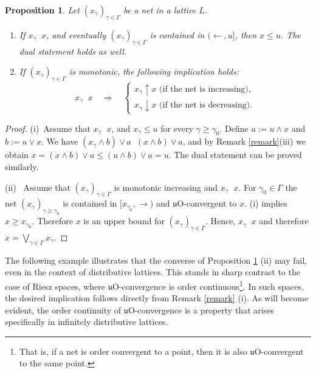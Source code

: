 \documentclass[12pt,a4paper]{amsart}
\numberwithin{equation}{section}
\newtheorem{prop}[thm]{Proposition}
\theoremstyle{definition}
\newcommand{\converges}[1]{\mathop{\overset{\text{#1}}{\longrightarrow}}}
\begin{document}
\begin{prop}\label{38}
	Let $(x_\gamma)_{\gamma\in\Gamma}$ be a net in a  lattice $L$.  
	\begin{enumerate}[{\rm(i)}]
	\item If $x_{\gamma} \converges{$\mathfrak{u}$O} x$,  and eventually $(x_\gamma)_{\gamma\in\Gamma}$ is contained in $(\leftarrow, u]$, then $x\le u$.  The dual statement holds as well.
	\item If $(x_{\gamma})_{\gamma \in \Gamma}$ is monotonic, the following implication holds:	
	\[x_{\gamma} \converges{$\mathfrak{u}$O} x\quad\Longrightarrow\quad \begin{cases}
x_{\gamma}\uparrow x\text{ (if the net is increasing)},\\
x_{\gamma}\downarrow x\text{ (if the net is decreasing)}.
\end{cases}\]
	\end{enumerate}
\end{prop}
\begin{proof}
{\rm(i)}~Assume that $x_{\gamma} \converges{$\mathfrak{u}$O} x$, and $x_\gamma\le u$ for every $\gamma\ge \gamma_0$.  Define $a:=u\wedge x$ and $b:=u\vee x$.  We have $(x_\gamma\wedge b)\vee a\converges{O}(x\wedge b)\vee a$,  and by  Remark \ref{remark}{\rm(iii)} we obtain $x=(x\wedge b)\vee a\le(u\wedge b)\vee a=u$.  The dual statement can be proved similarly.  

{\rm(ii)}~ Assume that $(x_\gamma)_{\gamma\in\Gamma}$ is monotonic increasing and $x_{\gamma} \converges{$\mathfrak{u}$O} x$.  For $\gamma_{0} \in \Gamma$ the net $(x_\gamma)_{\gamma\ge \gamma_0}$ is contained in $[x_{\gamma_0}, \rightarrow)$ and $\mathfrak u$O-convergent to $x$.  {\rm(i)} implies  $x\ge x_{\gamma_0}$.    Therefore
$x$ is an upper bound for $(x_{\gamma})_{\gamma \in \Gamma}$.  Hence, $x_\gamma\converges{O}x$ and therefore $x=\bigvee_{\gamma\in\Gamma}x_\gamma$.  
 

\end{proof}



The following example illustrates that the converse of Proposition \ref{38} (ii) may fail, even in the context of distributive lattices. This stands in sharp contrast to the case of Riesz spaces, where 
$\mathfrak{u}$O-convergence is order continuous\footnote{That is, if a net is order convergent to a point, then it is also 
$\mathfrak{u}$O-convergent to the same point.}. In such spaces, the desired implication follows directly from Remark \ref{remark} (i). As will become evident, the order continuity of 
$\mathfrak{u}$O-convergence is a property that arises specifically in infinitely distributive lattices.
\end{document}
